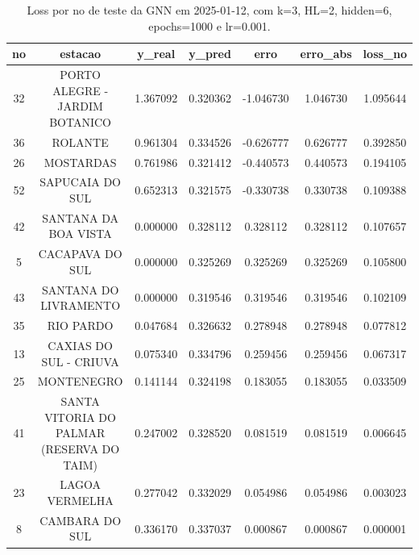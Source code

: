 \begin{table}[h]
\centering
\caption{Loss por no de teste da GNN em 2025-01-12, com k=3, HL=2, hidden=6, epochs=1000 e lr=0.001.}
\label{tab:gnn_loss_k3_hl2_h6_e1000_d20250112}
\begin{tabular}{ccccccc}
\toprule
no & estacao & y\_real & y\_pred & erro & erro\_abs & loss\_no \\
\midrule
32 & PORTO ALEGRE - JARDIM BOTANICO & 1.367092 & 0.320362 & -1.046730 & 1.046730 & 1.095644 \\
36 & ROLANTE & 0.961304 & 0.334526 & -0.626777 & 0.626777 & 0.392850 \\
26 & MOSTARDAS & 0.761986 & 0.321412 & -0.440573 & 0.440573 & 0.194105 \\
52 & SAPUCAIA DO SUL & 0.652313 & 0.321575 & -0.330738 & 0.330738 & 0.109388 \\
42 & SANTANA DA BOA VISTA & 0.000000 & 0.328112 & 0.328112 & 0.328112 & 0.107657 \\
5 & CACAPAVA DO SUL & 0.000000 & 0.325269 & 0.325269 & 0.325269 & 0.105800 \\
43 & SANTANA DO LIVRAMENTO & 0.000000 & 0.319546 & 0.319546 & 0.319546 & 0.102109 \\
35 & RIO PARDO & 0.047684 & 0.326632 & 0.278948 & 0.278948 & 0.077812 \\
13 & CAXIAS DO SUL - CRIUVA & 0.075340 & 0.334796 & 0.259456 & 0.259456 & 0.067317 \\
25 & MONTENEGRO & 0.141144 & 0.324198 & 0.183055 & 0.183055 & 0.033509 \\
41 & SANTA VITORIA DO PALMAR (RESERVA DO TAIM) & 0.247002 & 0.328520 & 0.081519 & 0.081519 & 0.006645 \\
23 & LAGOA VERMELHA & 0.277042 & 0.332029 & 0.054986 & 0.054986 & 0.003023 \\
8 & CAMBARA DO SUL & 0.336170 & 0.337037 & 0.000867 & 0.000867 & 0.000001 \\
\bottomrule
\end{tabular}
\end{table}
